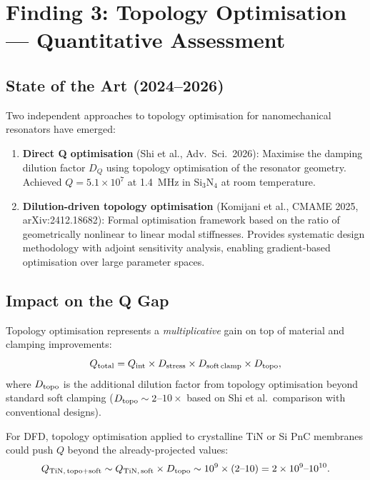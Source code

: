 \documentclass[11pt]{article}
\theoremstyle{definition}
\theoremstyle{remark}
\newcommand{\ee}[1]{\times 10^{#1}}
\begin{document}
\section{Finding 3: Topology Optimisation --- Quantitative Assessment}
\label{sec:topo_opt}

\subsection{State of the Art (2024--2026)}

Two independent approaches to topology optimisation for
nanomechanical resonators have emerged:

\begin{enumerate}[nosep]
\item \textbf{Direct Q optimisation} (Shi et al., Adv.\ Sci.\
  2026): Maximise the damping dilution factor $D_Q$ using
  topology optimisation of the resonator geometry. Achieved
  $Q = 5.1\ee{7}$ at 1.4~MHz in Si$_3$N$_4$ at room temperature.

\item \textbf{Dilution-driven topology optimisation} (Komijani
  et al., CMAME 2025, arXiv:2412.18682): Formal optimisation
  framework based on the ratio of geometrically nonlinear to
  linear modal stiffnesses. Provides systematic design methodology
  with adjoint sensitivity analysis, enabling gradient-based
  optimisation over large parameter spaces.
\end{enumerate}

\subsection{Impact on the Q Gap}

Topology optimisation represents a \textit{multiplicative} gain
on top of material and clamping improvements:
\begin{equation}
Q_{\rm total} = Q_{\rm int} \times D_{\rm stress} \times
D_{\rm soft\,clamp} \times D_{\rm topo},
\end{equation}
where $D_{\rm topo}$ is the additional dilution factor from
topology optimisation beyond standard soft clamping ($D_{\rm topo}
\sim 2$--$10\times$ based on Shi et al.\ comparison with
conventional designs).

For DFD, topology optimisation applied to crystalline TiN or Si
PnC membranes could push $Q$ beyond the already-projected values:
\begin{equation}
Q_{\rm TiN,\,topo+soft} \sim Q_{\rm TiN,\,soft} \times D_{\rm topo}
\sim 10^9 \times (2\text{--}10) = 2\ee{9}\text{--}10^{10}.
\end{equation}
\end{document}
